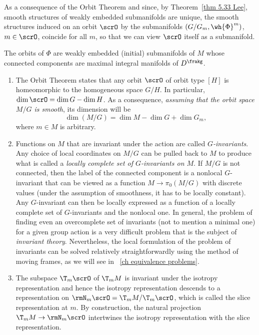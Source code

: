 As a consequence of the Orbit Theorem and since, by Theorem~\ref{thm 5.33 Lee}, smooth structures of weakly embedded submanifolds are unique, the smooth structures induced on an orbit $\scrO$ by the submanifolds $(G\slash G_m,\wh{\Phi}^m)$, $m\in \scrO$, coincide for all $m$, so that we can view $\scrO$ itself as a submanifold.  

\begin{cor}[{{\cite[Cor.~6.2.9]{RS1}}}]
    The orbits of $\Phi$ are weakly embedded (initial) submanifolds of $M$ whose connected components are maximal integral manifolds of $D^\frakg$.
\end{cor}

\begin{rem}[{{\cite[Rem.~6.2.10]{RS1}}}]\label{rem 6.2.10 RS1}
    \begin{enumerate}
        \item The Orbit Theorem states that any orbit $\scrO$ of orbit type $[H]$ is homeomorphic to the homogeneous space $G\slash H$. In particular, $\dim \scrO=\dim G-\dim H$. As a consequence, \emph{assuming that the orbit space $M\slash G$ is smooth}, its dimension will be 
        \[\dim (M\slash G)=\dim M-\dim G+\dim G_m,\] 
        where $m\in M$ is arbitrary. 
        
        \item Functions on $M$ that are invariant under the action are called \emph{$G$-invariants}. Any choice of local coordinates on $M\slash G$ can be pulled back to $M$ to produce what is called a \emph{locally complete set of $G$-invariants on $M$}. If $M\slash G$ is not connected, then the label of the connected component is a nonlocal $G$-invariant that can be viewed as a function $M\to \pi_0(M\slash G)$ with discrete values (under the assumption of smoothness, it has to be locally constant). Any $G$-invariant can then be locally expressed as a function of a locally complete set of $G$-invariants and the nonlocal one. In general, the problem of finding even an overcomplete set of invariants (not to mention a minimal one) for a given group action is a very difficult problem that is the subject of \emph{invariant theory}. Nevertheless, the local formulation of the problem of invariants can be solved relatively straightforwardly using the method of moving frames, as we will see in \Chap~\ref{ch equivalence problems}.
        
        \item The subspace $\T_m\scrO$ of $\T_mM$ is invariant under the isotropy representation and hence the isotropy representation descends to a representation on $\rmN_m\scrO=\T_mM\slash \T_m\scrO$, which is called the slice representation at $m$. By construction, the natural projection $\T_mM\to \rmN_m\scrO$ intertwines the isotropy representation with the slice representation.


\end{enumerate}
\end{rem}
